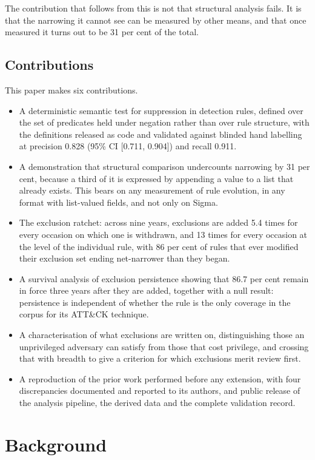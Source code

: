 The contribution that follows from this is not that structural analysis fails. It is that the narrowing it cannot see can be measured by other means, and that once measured it turns out to be 31 per cent of the total.

\subsection{Contributions}

This paper makes six contributions.

\begin{itemize}
  \item A deterministic semantic test for suppression in detection rules, defined over the set of predicates held under negation rather than over rule structure, with the definitions released as code and validated against blinded hand labelling at precision 0.828 (95\% CI [0.711, 0.904]) and recall 0.911.
  \item A demonstration that structural comparison undercounts narrowing by 31 per cent, because a third of it is expressed by appending a value to a list that already exists. This bears on any measurement of rule evolution, in any format with list-valued fields, and not only on Sigma.
  \item The exclusion ratchet: across nine years, exclusions are added 5.4 times for every occasion on which one is withdrawn, and 13 times for every occasion at the level of the individual rule, with 86 per cent of rules that ever modified their exclusion set ending net-narrower than they began.
  \item A survival analysis of exclusion persistence showing that 86.7 per cent remain in force three years after they are added, together with a null result: persistence is independent of whether the rule is the only coverage in the corpus for its ATT\&CK technique.
  \item A characterisation of what exclusions are written on, distinguishing those an unprivileged adversary can satisfy from those that cost privilege, and crossing that with breadth to give a criterion for which exclusions merit review first.
  \item A reproduction of the prior work performed before any extension, with four discrepancies documented and reported to its authors, and public release of the analysis pipeline, the derived data and the complete validation record.
\end{itemize}

\section{Background}
\label{sec:background}

